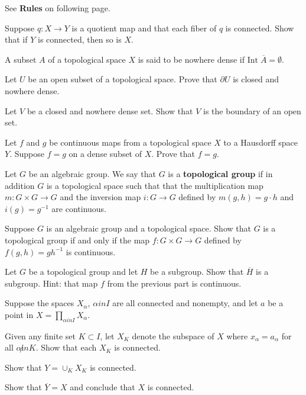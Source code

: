 \documentclass{homework651}
\def\ra{\rightarrow}
\begin{document}
See \textbf{Rules} on following page.

\begin{problems}
\problem Suppose $q: X\to Y$ is a quotient map and that each fiber of $q$ is connected.
Show that if $Y$ is connected, then so is $X$.

\problem A subset $A$ of a topological space $X$ is said to be nowhere dense if $\mathrm{Int}\; \overline{A} = \emptyset$.
\begin{subproblems}
\item Let $U$ be an open subset of a topological space. Prove that $\partial U$ is closed and nowhere dense.
\item Let $V$ be a closed and nowhere dense set. Show that $V$ is the boundary of an open set.
\end{subproblems}


\problem Let $f$ and $g$ be continuous maps from a topological space $X$ to a Hausdorff
space $Y$.  Suppose $f=g$ on a dense subset of $X$. Prove that $f=g$. 


\problem Let $G$ be an algebraic group.  We say that $G$ is a {\bf topological group}
if in addition $G$ is a topological space
such that that the multiplication
map $m:G\times G\ra G$ and the inversion map $i:G\ra G$ defined by $m(g,h)=g\cdot h$ and $i(g)=g^{-1}$
are continuous.
\begin{subproblems}
\item
Suppose $G$ is an algebraic group and a topological space.  Show that $G$ is a 
topological group if and only if the map $f:G\times G\ra G$ defined by $f(g,h)=g h^{-1}$
is continuous.
\item Let $G$ be a topological group and let $H$ be a subgroup.  Show that $\overline H$ is
a subgroup.  Hint: that map $f$ from the previous part is continuous. 

\end{subproblems}

\problem Suppose the spaces $X_\alpha$, $\alpha in I$ are all connected
and nonempty, and let $a$ be a point in $X=\prod_{\alpha in I} X_\alpha$.
\begin{subproblems}
\item Given any finite set $K\subset I$, let $X_K$ denote the subspace
of $X$ where $x_\alpha = a_\alpha$ for all $\alpha\not in K$.  Show that 
each $X_K$ is connected.
\item Show that $Y = \cup_{K} X_K$ is connected.
\item Show that $\overline Y = X$ and conclude that $X$ is connected.
\end{subproblems}


\end{problems}
\end{document}
